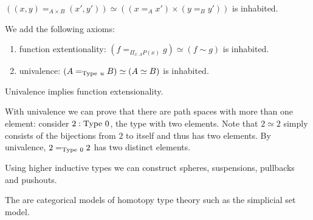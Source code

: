 \begin{boxlem}
    $((x,y) \mathrel{=_{A \times B} (x', y')}) \simeq ((x \mathrel{=_A} x') \times (y \mathrel{=_B} y'))$ is inhabited.
\end{boxlem}

\begin{boxdefi}
    We add the following axioms:
    \begin{enumerate}
        \item \alert{function extentionality}: $(f \mathrel{=_{\Pi_{x : A}P(x)}} g) \simeq (f \sim g)$ is inhabited.
        \item \alert{univalence}: $(A \mathrel{=_{\mathrm{Type}\ u}} B) \simeq (A \simeq B)$ is inhabited.
    \end{enumerate}
\end{boxdefi}

\begin{boxthm}
    Univalence implies function extensionality.
\end{boxthm}

\begin{rem}
    With univalence we can prove that there are path spaces with more than one element:
    consider $2 : \mathrm{Type}\ 0$, the type with two elements.
    Note that $2 \simeq 2$ simply consists of the bijections from $2$ to itself and thus has two elements.
    By univalence, $2 \mathrel{=_{\mathrm{Type}\ 0}} 2$ has two distinct elements.
\end{rem}


\begin{rem}
    Using higher inductive types we can construct spheres, suspensions, pullbacks and pushouts.
\end{rem}

\begin{rem}
    The are categorical models of homotopy type theory such as the simplicial set model.
\end{rem}

